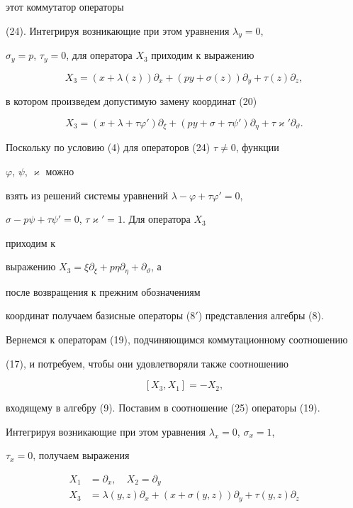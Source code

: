 этот коммутатор операторы 


(24). Интегрируя возникающие при этом уравнения $\lambda_y=0$, 


$\sigma_y=p$, $\tau_y=0$, для оператора $X_3$ приходим к выражению


$$ 


X_3=(x+\lambda(z))\partial_x+(py+\sigma(z))\partial_y+ 


\tau(z)\partial_z, 


$$ 


в котором произведем допустимую замену координат (20)


$$ 


X_3=(x+\lambda+\tau\varphi')\partial_\xi+ 


(py+\sigma+\tau\psi')\partial_\eta+\tau\varkappa'\partial_\vartheta. 


$$ 


Поскольку по условию (4) для операторов (24) $\tau\ne 0$, функции 


$\varphi$, $\psi$, $\varkappa$ можно 


взять из решений системы уравнений $\lambda-\varphi+\tau\varphi'=0$, 


$\sigma-p\psi+\tau\psi'=0$, $\tau\varkappa'=1$. Для оператора $X_3$ 


приходим к 


выражению $X_3=\xi\partial_\xi+p\eta\partial_\eta+\partial_\vartheta$, а 


после возвращения к прежним обозначениям 


координат получаем базисные операторы (8${}'$) представления алгебры (8). 


 


Вернемся к операторам (19), подчиняющимся коммутационному соотношению 


(17), и потребуем, чтобы они удовлетворяли также соотношению 


\begin{equation} 


[X_3,X_1]=-X_2, 


\end{equation} 


входящему в алгебру (9). Поставим в соотношение (25) операторы (19). 


Интегрируя возникающие при этом уравнения $\lambda_x=0$, $\sigma_x=1$, 


$\tau_x=0$, получаем выражения 


\begin{equation} 


\begin{split} 


X_1&=\partial_x,\quad X_2=\partial_y\\ 


X_3&=\lambda(y,z)\partial_x+(x+\sigma(y,z))\partial_y+ 


\tau(y,z)\partial_z 


\end{split} 


\end{equation} 


